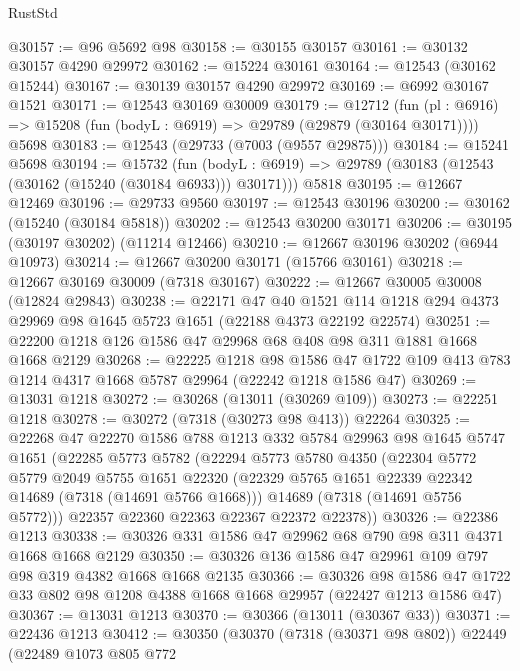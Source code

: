 \begin{lexlean}{RustStd}
\begin{coremodule}
@30157 := @96 @5692 @98
@30158 := @30155 @30157
@30161 := @30132 @30157 @4290 @29972
@30162 := @15224 @30161
@30164 := @12543 (@30162 @15244)
@30167 := @30139 @30157 @4290 @29972
@30169 := @6992 @30167 @1521
@30171 := @12543 @30169 @30009
@30179 := @12712
    (fun (pl : @6916) => @15208 (fun (bodyL : @6919) => @29789 (@29879 (@30164 @30171))))
    @5698
@30183 := @12543 (@29733 (@7003 (@9557 @29875)))
@30184 := @15241 @5698
@30194 := @15732
    (fun (bodyL : @6919) => @29789 (@30183 (@12543 (@30162 (@15240 (@30184 @6933))) @30171)))
    @5818
@30195 := @12667 @12469
@30196 := @29733 @9560
@30197 := @12543 @30196
@30200 := @30162 (@15240 (@30184 @5818))
@30202 := @12543 @30200 @30171
@30206 := @30195 (@30197 @30202) (@11214 @12466)
@30210 := @12667 @30196 @30202 (@6944 @10973)
@30214 := @12667 @30200 @30171 (@15766 @30161)
@30218 := @12667 @30169 @30009 (@7318 @30167)
@30222 := @12667 @30005 @30008 (@12824 @29843)
@30238 := @22171
    @47
    @40
    @1521
    @114
    @1218
    @294
    @4373
    @29969
    @98
    @1645
    @5723
    @1651
    (@22188 @4373 @22192 @22574)
@30251 := @22200 @1218 @126 @1586 @47 @29968 @68 @408 @98 @311 @1881 @1668 @1668 @2129
@30268 := @22225
    @1218
    @98
    @1586
    @47
    @1722
    @109
    @413
    @783
    @1214
    @4317
    @1668
    @5787
    @29964
    (@22242 @1218 @1586 @47)
@30269 := @13031 @1218
@30272 := @30268 (@13011 (@30269 @109))
@30273 := @22251 @1218
@30278 := @30272 (@7318 (@30273 @98 @413)) @22264
@30325 := @22268
    @47
    @22270
    @1586
    @788
    @1213
    @332
    @5784
    @29963
    @98
    @1645
    @5747
    @1651
    (@22285
      @5773
      @5782
      (@22294
        @5773
        @5780
        @4350
        (@22304
          @5772
          @5779
          @2049
          @5755
          @1651
          @22320
          (@22329 @5765 @1651 @22339 @22342 @14689 (@7318 (@14691 @5766 @1668)))
          @14689
          (@7318 (@14691 @5756 @5772)))
        @22357
        @22360
        @22363
        @22367
        @22372
        @22378))
@30326 := @22386 @1213
@30338 := @30326 @331 @1586 @47 @29962 @68 @790 @98 @311 @4371 @1668 @1668 @2129
@30350 := @30326 @136 @1586 @47 @29961 @109 @797 @98 @319 @4382 @1668 @1668 @2135
@30366 := @30326
    @98
    @1586
    @47
    @1722
    @33
    @802
    @98
    @1208
    @4388
    @1668
    @1668
    @29957
    (@22427 @1213 @1586 @47)
@30367 := @13031 @1213
@30370 := @30366 (@13011 (@30367 @33))
@30371 := @22436 @1213
@30412 := @30350
    (@30370
      (@7318 (@30371 @98 @802))
      @22449
      (@22489
        @1073
        @805
        @772

\end{coremodule}
\end{lexlean}
